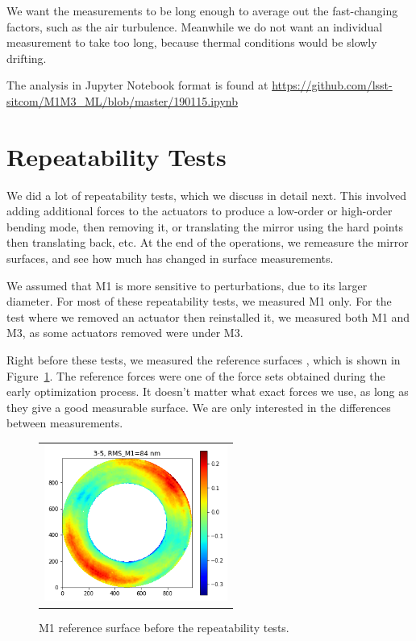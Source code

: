 \documentclass [twoside,openbib,12pt]{article}
\begin{document}
We want the measurements to be long enough to average out the
fast-changing factors, such as the air turbulence. Meanwhile we do not
want an individual measurement to take too long, because thermal
conditions would be slowly drifting.


The analysis in Jupyter Notebook format is found at
\url{https://github.com/lsst-sitcom/M1M3_ML/blob/master/190115.ipynb}

\section{Repeatability Tests}

We did a lot of repeatability tests, which we discuss in detail
next. This involved adding additional forces to the actuators to
produce a low-order or high-order bending mode, then removing it, or
translating the mirror using the hard points then translating back, etc.
At the end of the operations, we remeasure the mirror surfaces, and see
how much has changed in surface measurements.

We assumed that M1 is more sensitive to perturbations, due to its
larger diameter.
For most of these repeatability tests,
we measured M1 only. For the test where we removed an actuator then
reinstalled it, we measured both M1 and M3, as some actuators removed were
under M3.

Right before these tests, we measured the reference surfaces , which is shown in
Figure~\ref{fig:repeatRef}.
The reference forces were one of the force sets obtained during the
early optimization process.
It doesn't matter what exact forces we use, as long as they give a
good measurable surface. We are only interested in the differences
between measurements.

 \begin{figure}[bthp]
   \begin{center}
   \begin{tabular}{c}
\includegraphics[width=60mm]{figures/repeatRef.png}
  \end{tabular}
   \end{center}
   \caption
  { \label{fig:repeatRef}
M1 reference surface before the repeatability tests.
 }
\end{figure}
\end{document}

